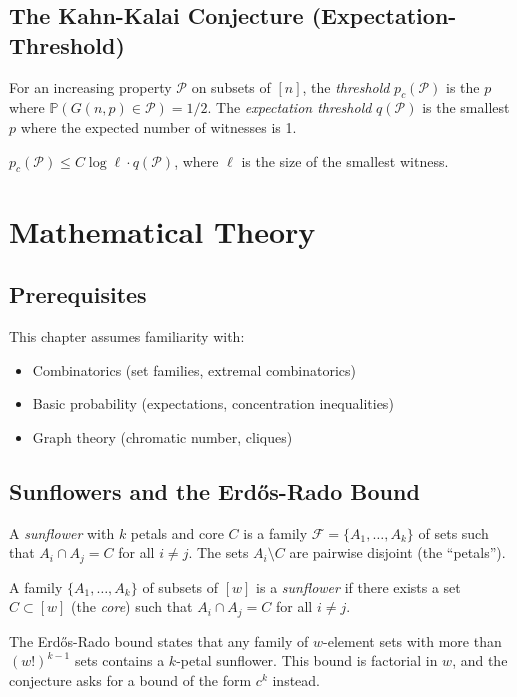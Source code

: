 \subsection{The Kahn-Kalai Conjecture (Expectation-Threshold)}
For an increasing property $\mathcal{P}$ on subsets of $[n]$, the \emph{threshold} $p_c(\mathcal{P})$ is the $p$ where $\mathbb{P}(G(n,p) \in \mathcal{P}) = 1/2$. The \emph{expectation threshold} $q(\mathcal{P})$ is the smallest $p$ where the expected number of witnesses is 1.

\begin{conjecture}
$p_c(\mathcal{P}) \le C \log \ell \cdot q(\mathcal{P})$, where $\ell$ is the size of the smallest witness.
\end{conjecture}

\section{Mathematical Theory}

\subsection{Prerequisites}
This chapter assumes familiarity with:
\begin{itemize}
\item Combinatorics (set families, extremal combinatorics)
\item Basic probability (expectations, concentration inequalities)
\item Graph theory (chromatic number, cliques)
\end{itemize}

\subsection{Sunflowers and the Erd\H{o}s-Rado Bound}

A \emph{sunflower} with $k$ petals and core $C$ is a family $\mathcal{F} = \{A_1, \ldots, A_k\}$ of sets such that $A_i \cap A_j = C$ for all $i \neq j$. The sets $A_i \setminus C$ are pairwise disjoint (the ``petals'').

\begin{definition}[Sunflower]
A family $\{A_1, \ldots, A_k\}$ of subsets of $[w]$ is a \emph{sunflower} if there exists a set $C \subset [w]$ (the \emph{core}) such that $A_i \cap A_j = C$ for all $i \neq j$.
\end{definition}

The Erd\H{o}s-Rado bound states that any family of $w$-element sets with more than $(w!)^{k-1}$ sets contains a $k$-petal sunflower. This bound is factorial in $w$, and the conjecture asks for a bound of the form $c^k$ instead.

